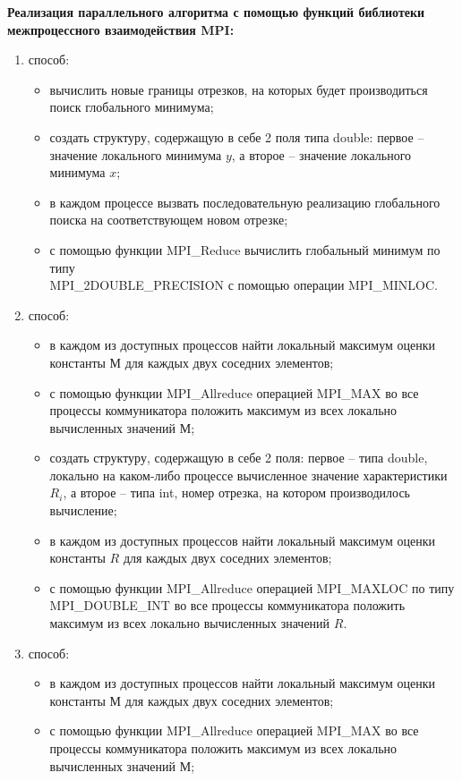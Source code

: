 \documentclass{report}
\begin{document}
\textbf{Реализация параллельного алгоритма с помощью функций библиотеки межпроцессного взаимодействия MPI:}
\begin{enumerate}
  \item способ:
    \begin{itemize}
        \item вычислить новые границы отрезков, на которых будет производиться поиск глобального минимума;
        \item создать структуру, содержащую в себе 2 поля типа double: первое – значение локального минимума $y$, а второе – значение локального минимума $x$;
        \item в каждом процессе вызвать последовательную реализацию глобального поиска на соответствующем новом отрезке;
        \item с помощью функции MPI\_Reduce вычислить глобальный минимум по типу\\ MPI\_2DOUBLE\_PRECISION с помощью операции MPI\_MINLOC.
    \end{itemize}
  \item способ:
    \begin{itemize}
      \item в каждом из доступных процессов найти локальный максимум оценки константы М для каждых двух соседних элементов;
      \item с помощью функции MPI\_Allreduce операцией MPI\_MAX во все процессы коммуникатора положить максимум из всех локально вычисленных значений М;
      \item создать структуру, содержащую в себе 2 поля: первое – типа double, локально на каком-либо процессе вычисленное значение характеристики $R_i$, а второе – типа int, номер отрезка, на котором производилось вычисление;
      \item в каждом из доступных процессов найти локальный максимум оценки константы $R$ для каждых двух соседних элементов;
      \item с помощью функции MPI\_Allreduce операцией MPI\_MAXLOC по типу\\ MPI\_DOUBLE\_INT во все процессы коммуникатора положить максимум из всех локально вычисленных значений $R$.
    \end{itemize}
  \item способ:
    \begin{itemize}
      \item в каждом из доступных процессов найти локальный максимум оценки константы М для каждых двух соседних элементов;
      \item с помощью функции MPI\_Allreduce операцией MPI\_MAX во все процессы коммуникатора положить максимум из всех локально вычисленных значений М;

\end{itemize}
\end{enumerate}
\end{document}
